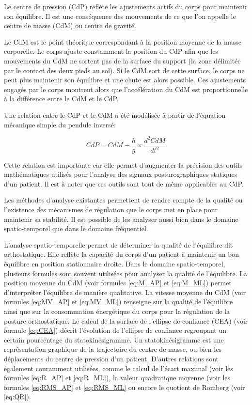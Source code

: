 Le centre de pression (CdP) reflète les ajustements actifs du corps pour maintenir son équilibre. 
Il est une conséquence des mouvements de ce que l'on appelle le centre de masse (CdM) ou centre de gravité. 

Le CdM est le point théorique correspondant à la position moyenne de la masse corporelle. 
Le corps ajuste constamment la position du CdP afin que les mouvements du CdM ne sortent pas de la surface du support (la zone délimitée par le contact des deux pieds au sol). 
Si le CdM sort de cette surface, le corps ne peut plus maintenir son équilibre et une chute est alors possible.
Ces ajustements engagés par le corps montrent alors que l’accélération du CdM est proportionnelle à la différence entre le CdM et le CdP.

Une relation entre le CdP et le CdM a été modélisée à partir de l’équation mécanique simple du pendule inversé:

\begin{equation}
    CdP = CdM - \frac{h}{g} \times \frac{d^2 CdM}{dt^2} 
\end{equation}

Cette relation est importante car elle permet d’augmenter la précision des outils mathématiques utilisés pour l’analyse des signaux posturographiques statiques d’un patient. 
Il est à noter que ces outils sont tout de même applicables au CdP.

Les méthodes d'analyse existantes permettent de rendre compte de la qualité ou l'existence des mécanismes de régulation que le corps met en place pour maintenir sa stabilité. 
Il est possible de les analyser aussi bien dans le domaine spatio-temporel que dans le domaine fréquentiel.

L’analyse spatio-temporelle permet de déterminer la qualité de l’équilibre dit orthostatique. 
Elle reflète la capacité du corps d’un patient à maintenir un bon équilibre en position stationnaire droite. 
Dans le domaine spatio-temporel, plusieurs formules sont souvent utilisées pour analyser la qualité de l’équilibre. 
La position moyenne du CdM (voir formules \ref{eq:M_AP} et \ref{eq:M_ML}) permet d’interpréter l’équilibre de manière qualitative. 
La vitesse moyenne du CdM (voir formules \ref{eq:MV_AP} et \ref{eq:MV_ML}) renseigne sur la qualité de l’équilibre ainsi que sur la consommation énergétique du corps pour la régulation de la posture orthostatique. 
Le calcul de la surface de l’ellipse de confiance (CEA) (voir formule \ref{eq:CEA}) décrit l’évolution de l’ellipse de confiance regroupant un certain pourcentage du statokinésigramme. 
Un statokinésigramme est une représentation graphique de la trajectoire du centre de masse, ou bien les déplacements du centre de pression d’un patient. 
D’autres relations sont également couramment utilisées, comme le calcul de l’écart maximal (voir les formules \ref{eq:R_AP} et \ref{eq:R_ML}), la valeur quadratique moyenne (voir les formules \ref{eq:RMS_AP} et \ref{eq:RMS_ML} ou encore le quotient de Romberg (voir \ref{eq:QR}).

